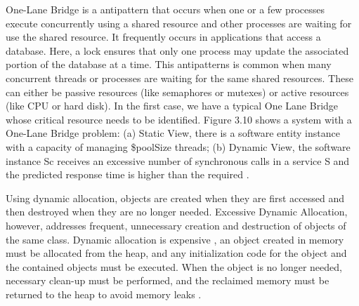 \documentclass[times]{stvrauth}
\begin{document}
One-Lane Bridge is a antipattern that occurs when one or a few processes execute concurrently using a shared resource and other processes are waiting for use the shared resource. It frequently occurs in applications that access a database. Here, a lock ensures that only one process may update the associated portion of the database at a time. This antipatterns is common when many concurrent threads or processes are waiting for the same shared resources. These can either be passive resources (like semaphores or mutexes) or active resources (like CPU or hard disk). In the first case, we have a typical One Lane Bridge whose critical resource needs to be identified. Figure 3.10 shows a system with a One-Lane Bridge problem: (a) Static View, there is a software entity instance with a capacity of managing \$poolSize threads; (b) Dynamic View, the software instance Sc receives an excessive number of synchronous calls in a service S and the predicted response time is higher than the required \cite{Vetoio2011}.


Using dynamic allocation, objects are created when they are first accessed and then destroyed when they are no longer needed. Excessive Dynamic Allocation, however, addresses frequent, unnecessary creation and destruction of objects of the same class. Dynamic allocation is expensive , an object created in memory must be allocated from the heap, and any initialization code for the object and the contained objects must be executed. When the object is no longer needed, necessary clean-up must be performed, and the reclaimed memory must be returned to the heap to avoid memory leaks \cite{Smith2002} \cite{Smith2003}.
\end{document}
